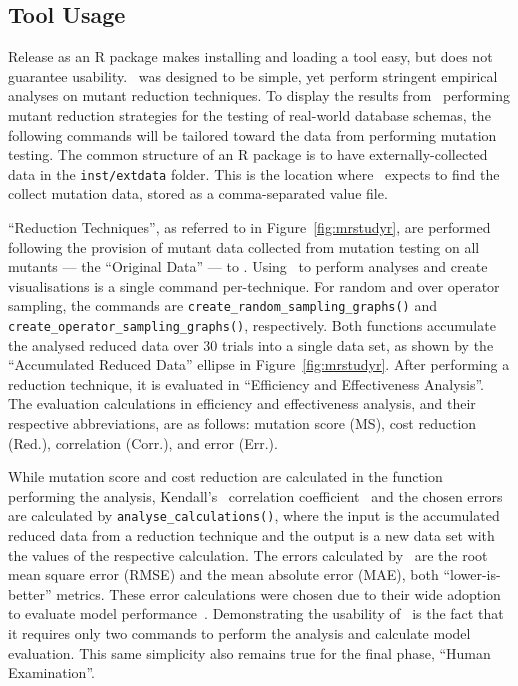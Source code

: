 \subsection{Tool Usage}



Release as an R package makes installing and loading a tool easy, but does not guarantee usability. \mr~was designed to
be simple, yet perform stringent empirical analyses on mutant reduction techniques. To display the results from
\mr~performing mutant reduction strategies for the testing of real-world database schemas, the following commands will
be tailored toward the data from performing mutation testing. The common structure of an R package is to have
externally-collected data in the \texttt{inst/extdata} folder. This is the location where \mr~expects to find the
collect mutation data, stored as a comma-separated value file.

``Reduction Techniques'', as referred to in Figure~\ref{fig:mrstudyr}, are performed following the
provision of mutant data collected from mutation testing on all mutants --- the ``Original Data'' ---
to \mr. Using \mr~to perform analyses and create visualisations is a single command per-technique.
For random and over operator sampling, the commands are {\texttt{create\_random\_sampling\_graphs()}}
and {\texttt{create\_operator\_sampling\_graphs()}}, respectively. Both functions accumulate the analysed
reduced data over 30 trials into a single data set, as shown by the ``Accumulated Reduced Data'' ellipse
in Figure~\ref{fig:mrstudyr}. After performing a reduction technique, it is evaluated in ``Efficiency and
Effectiveness Analysis''. The evaluation calculations in efficiency and effectiveness analysis, and their
respective abbreviations, are as follows: mutation score (MS), cost reduction (Red.), correlation (Corr.),
and error (Err.).


While mutation score and cost reduction are calculated in the function performing the analysis, Kendall's
\taub~correlation coefficient~\cite{mcminn2016virtual} and the chosen errors are calculated by
\texttt{analyse\_calculations()}, where the input is the accumulated reduced data from a reduction technique
and the output is a new data set with the values of the respective calculation.  The errors calculated by
\mr~are the root mean square error (RMSE) and the mean absolute error (MAE), both ``lower-is-better'' metrics.
These error calculations were chosen due to their wide adoption to evaluate model performance~\cite{chai2014root}.
Demonstrating the usability of \mr~is the fact that it requires only two commands to perform the analysis and
calculate model evaluation. This same simplicity also remains true for the final phase, ``Human Examination''.

